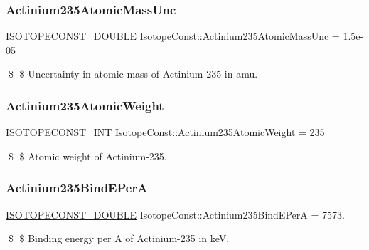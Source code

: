 \subsubsection{\texorpdfstring{Actinium235\+Atomic\+Mass\+Unc}{Actinium235AtomicMassUnc}}
{\footnotesize\ttfamily \mbox{\hyperlink{group___isotope_const-_macros_ga8f45a7272ce02c0b4c65c44636ed719a}{I\+S\+O\+T\+O\+P\+E\+C\+O\+N\+S\+T\+\_\+\+D\+O\+U\+B\+LE}} Isotope\+Const\+::\+Actinium235\+Atomic\+Mass\+Unc = 1.\+5e-\/05}

\$ \$ Uncertainty in atomic mass of Actinium-\/235 in amu. \mbox{\label{group___isotope_const-_actinium-_ac235_gadaa1b3757b6ea2b8639cb4759de93412}} 
\subsubsection{\texorpdfstring{Actinium235\+Atomic\+Weight}{Actinium235AtomicWeight}}
{\footnotesize\ttfamily \mbox{\hyperlink{group___isotope_const-_macros_ga5f18360b3e99483a35c32d789e62621c}{I\+S\+O\+T\+O\+P\+E\+C\+O\+N\+S\+T\+\_\+\+I\+NT}} Isotope\+Const\+::\+Actinium235\+Atomic\+Weight = 235}

\$ \$ Atomic weight of Actinium-\/235. \mbox{\label{group___isotope_const-_actinium-_ac235_ga4aa82ed5cb7fe8365f1af2b7ae34ec2e}} 
\subsubsection{\texorpdfstring{Actinium235\+Bind\+E\+PerA}{Actinium235BindEPerA}}
{\footnotesize\ttfamily \mbox{\hyperlink{group___isotope_const-_macros_ga8f45a7272ce02c0b4c65c44636ed719a}{I\+S\+O\+T\+O\+P\+E\+C\+O\+N\+S\+T\+\_\+\+D\+O\+U\+B\+LE}} Isotope\+Const\+::\+Actinium235\+Bind\+E\+PerA = 7573.}

\$ \$ Binding energy per A of Actinium-\/235 in keV. \mbox{\label{group___isotope_const-_actinium-_ac235_ga3664126ff9e67df83e8b02b115937573}} 
